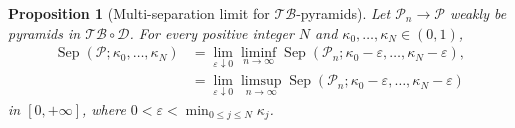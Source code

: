 \documentclass{amsart}
\theoremstyle{plain}
\newtheorem{proposition}[theorem]{Proposition}
\theoremstyle{definition}
\theoremstyle{remark}
\newcommand{\D}{\mathcal{D}}
\newcommand{\TB}{\mathcal{TB}}
\begin{document}
\begin{proposition}[Multi-separation limit for $\TB$-pyramids]
\label{prop:tb-multi-directed-separation-pyramid-limit}
Let $\mathcal P_n\to\mathcal P$ weakly be pyramids in $\TB\circ\D$.  For
every positive integer $N$ and $\kappa_0,\ldots,\kappa_N\in(0,1)$,
\begin{align}
\operatorname{Sep}(\mathcal P;\kappa_0,\ldots,\kappa_N)
&=\lim_{\varepsilon\downarrow0}\liminf_{n\to\infty}
\operatorname{Sep}(\mathcal P_n;\kappa_0-\varepsilon,\ldots,
\kappa_N-\varepsilon),
\label{eq:multi-directed-separation-pyramid-limit-liminf}\\
&=\lim_{\varepsilon\downarrow0}\limsup_{n\to\infty}
\operatorname{Sep}(\mathcal P_n;\kappa_0-\varepsilon,\ldots,
\kappa_N-\varepsilon)
\label{eq:multi-directed-separation-pyramid-limit-limsup}
\end{align}
in $[0,+\infty]$, where
$0<\varepsilon<\min_{0\leq j\leq N}\kappa_j$.
\end{proposition}
\end{document}
